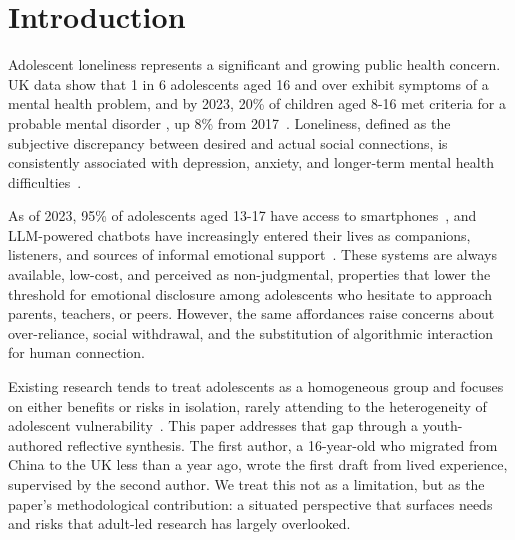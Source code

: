 \documentclass[manuscript]{acmart}
\begin{document}
\maketitle

\section{Introduction}

Adolescent loneliness represents a significant and growing public health concern. UK data show
that 1 in 6 adolescents aged 16 and over exhibit symptoms of a mental health problem, and
by 2023, 20\% of children aged 8-16 met criteria for a probable mental disorder , up 8\%
from 2017~\cite{baker2024mental}. Loneliness, defined as the subjective discrepancy between
desired and actual social connections, is consistently associated with depression, anxiety,
and longer-term mental health difficulties~\cite{PerlmanPeplau1981}.

As of 2023, 95\% of adolescents aged 13-17 have access to smartphones~\cite{ActForYouth2024},
and LLM-powered chatbots have increasingly entered their lives as companions, listeners, and
sources of informal emotional support~\cite{jin2025applications}. These systems are always
available, low-cost, and perceived as non-judgmental, properties that lower the threshold
for emotional disclosure among adolescents who hesitate to approach parents, teachers, or
peers. However, the same affordances raise concerns about over-reliance, social withdrawal,
and the substitution of algorithmic interaction for human connection. 

Existing research tends to treat adolescents as a homogeneous group and focuses on either
benefits or risks in isolation, rarely attending to the heterogeneity of adolescent
vulnerability~\cite{de2025emotional,Skjuve2022}. This paper addresses that gap through a
youth-authored reflective synthesis. The first author, a 16-year-old who migrated from
China to the UK less than a year ago, wrote the first draft from lived experience,
supervised by the second author. We treat this not as a limitation, but as the paper's
methodological contribution: a situated perspective that surfaces needs and risks that
adult-led research has largely overlooked.


\end{document}

